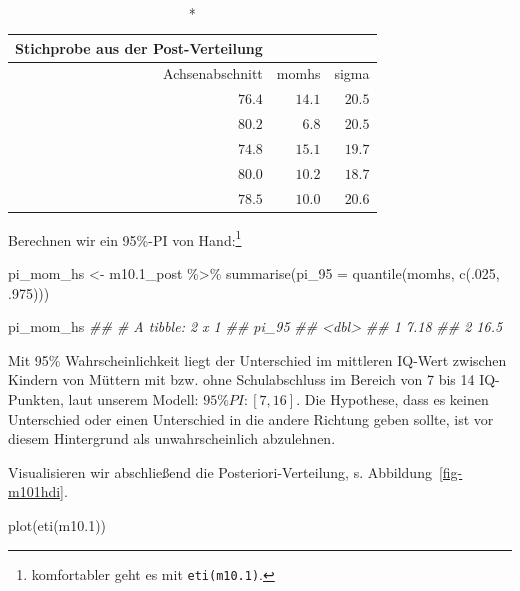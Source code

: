 \documentclass[
  a4paper,
  DIV=11]{scrreprt}
\newenvironment{Shaded}{\begin{snugshade}}{\end{snugshade}}
\newcommand{\AttributeTok}[1]{\textcolor[rgb]{0.40,0.45,0.13}{#1}}
\newcommand{\DecValTok}[1]{\textcolor[rgb]{0.68,0.00,0.00}{#1}}
\newcommand{\DocumentationTok}[1]{\textcolor[rgb]{0.37,0.37,0.37}{\textit{#1}}}
\newcommand{\FloatTok}[1]{\textcolor[rgb]{0.68,0.00,0.00}{#1}}
\newcommand{\FunctionTok}[1]{\textcolor[rgb]{0.28,0.35,0.67}{#1}}
\newcommand{\NormalTok}[1]{\textcolor[rgb]{0.00,0.23,0.31}{#1}}
\newcommand{\OtherTok}[1]{\textcolor[rgb]{0.00,0.23,0.31}{#1}}
\newcommand{\SpecialCharTok}[1]{\textcolor[rgb]{0.37,0.37,0.37}{#1}}
\theoremstyle{definition}
\theoremstyle{remark}
\begin{document}
\begin{longtable}{rrr}
\caption*{
{\large Stichprobe aus der Post-Verteilung}
} \\ 
\toprule
Achsenabschnitt & momhs & sigma \\ 
\midrule
$76.4$ & $14.1$ & $20.5$ \\ 
$80.2$ & $6.8$ & $20.5$ \\ 
$74.8$ & $15.1$ & $19.7$ \\ 
$80.0$ & $10.2$ & $18.7$ \\ 
$78.5$ & $10.0$ & $20.6$ \\ 
\bottomrule
\end{longtable}

Berechnen wir ein 95\%-PI von Hand:\footnote{komfortabler geht es mit
  \texttt{eti(m10.1)}.}

\begin{Shaded}
\begin{Highlighting}[]
\NormalTok{pi\_mom\_hs }\OtherTok{\textless{}{-}}
\NormalTok{  m10}\FloatTok{.1}\NormalTok{\_post }\SpecialCharTok{\%\textgreater{}\%} 
  \FunctionTok{summarise}\NormalTok{(}\AttributeTok{pi\_95 =} \FunctionTok{quantile}\NormalTok{(momhs, }\FunctionTok{c}\NormalTok{(.}\DecValTok{025}\NormalTok{, .}\DecValTok{975}\NormalTok{)))}

\NormalTok{pi\_mom\_hs}
\DocumentationTok{\#\# \# A tibble: 2 x 1}
\DocumentationTok{\#\#   pi\_95}
\DocumentationTok{\#\#   \textless{}dbl\textgreater{}}
\DocumentationTok{\#\# 1  7.18}
\DocumentationTok{\#\# 2 16.5}
\end{Highlighting}
\end{Shaded}

Mit 95\% Wahrscheinlichkeit liegt der Unterschied im mittleren IQ-Wert
zwischen Kindern von Müttern mit bzw. ohne Schulabschluss im Bereich von
7 bis 14 IQ-Punkten, laut unserem Modell: \(95\%PI: [7,16]\). Die
Hypothese, dass es keinen Unterschied oder einen Unterschied in die
andere Richtung geben sollte, ist vor diesem Hintergrund als
unwahrscheinlich abzulehnen.

Visualisieren wir abschließend die Posteriori-Verteilung, s.
Abbildung~\ref{fig-m101hdi}.

\begin{Shaded}
\begin{Highlighting}[]
\FunctionTok{plot}\NormalTok{(}\FunctionTok{eti}\NormalTok{(m10}\FloatTok{.1}\NormalTok{))}
\end{Highlighting}
\end{Shaded}
\end{document}
